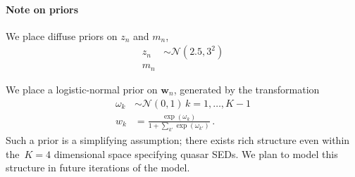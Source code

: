 \documentclass{article}
\begin{document}
\paragraph{Note on priors}
We place diffuse priors on $z_n$ and $m_n$, 
\begin{align}
  z_n &\sim \mathcal{N}(2.5, 3^2) \\
  m_n 
\end{align}

We place a logistic-normal prior on $\mathbf{w}_n$, generated by the transformation 
\begin{align}
  \omega_k &\sim \mathcal{N}(0, 1) \, k = 1, \dots, K-1 \\
  w_k &= \frac{\exp(\omega_k)}{1 + \sum_{k'} \exp(\omega_{k'})} \, .
\end{align}
Such a prior is a simplifying assumption; there exists rich structure even within the~${K=4}$ dimensional space specifying quasar SEDs. 
We plan to model this structure in future iterations of the model.  


\begin{table}[t]
\caption{%
Top: mean absolute and mean absolute percentage error of photometric redshift predictions with respect to spectroscopic ``ground truth''.
Bottom: number of predicted values covered by posterior sample quantiles of varying size. }
\label{tab:error}
\vskip 0in
\begin{center}
\begin{small}
\begin{sc}

\end{sc}
\end{small}
\end{center}
\vskip -0.1in
\end{table}
\end{document}
